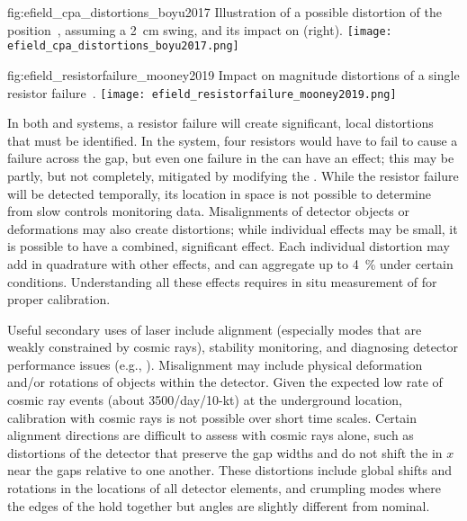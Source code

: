 \begin{dunefigure}{fig:efield_cpa_distortions_boyu2017}
{Illustration of a possible distortion of the  position~\cite{bib:yu2017a}, assuming a \SI{2}{\cm} swing, and its impact on \efield (right).}
\texttt{[image: efield\_cpa\_distortions\_boyu2017.png]}
\end{dunefigure}

\begin{dunefigure}{fig:efield_resistorfailure_mooney2019}
{Impact on \efield magnitude distortions of a single  resistor failure~\cite{bib:mooney2019a}.}
\texttt{[image: efield\_resistorfailure\_mooney2019.png]}
\end{dunefigure}

In both  and  systems, a resistor failure will create significant, local \efield distortions that must be identified. In the  system, four resistors would have to fail to cause a failure across the  gap, but even one failure in the  can have an effect; this may be partly, but not completely, mitigated by modifying the . While the resistor failure will be detected temporally, its location in space is not possible to determine from slow controls monitoring data. Misalignments of detector objects or deformations may also create  \efield distortions; while individual effects may be small, it is possible to have a combined, significant effect.
Each individual \efield distortion may add in quadrature with other effects, and can aggregate up to \SI{4}{\%} under certain conditions. Understanding all these effects requires in situ  measurement of \efield for proper calibration. 

Useful secondary uses of laser include alignment (especially modes that are weakly constrained by cosmic rays),
stability monitoring, and diagnosing detector performance issues
(e.g., ).  
Misalignment may include physical deformation and/or rotations of objects within the detector. Given the expected low rate of cosmic ray events (about 3500/day/10-kt) at the underground location, calibration with cosmic rays is not possible over short time scales. Certain alignment directions  are difficult to assess with cosmic rays alone, such as distortions of the detector that preserve the gap widths and do not shift the  in $x$ near the gaps relative to one another.
These distortions include global shifts and rotations in the locations of all detector elements, and crumpling modes where the edges of the  hold together but angles are slightly different from nominal.   


